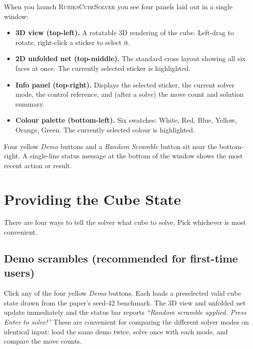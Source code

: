 \documentclass[11pt,a4paper]{article}
\newcommand{\app}{\textsc{RubiksCubeSolver}}
\begin{document}
When you launch \app{} you see four panels laid out in a single window:

\begin{itemize}[leftmargin=2em]
  \item \textbf{3D view (top-left).} A rotatable 3D rendering of the cube.
        Left-drag to rotate, right-click a sticker to select it.
  \item \textbf{2D unfolded net (top-middle).} The standard cross layout
        showing all six faces at once. The currently selected sticker is
        highlighted.
  \item \textbf{Info panel (top-right).} Displays the selected sticker,
        the current solver mode, the control reference, and (after a
        solve) the move count and solution summary.
  \item \textbf{Colour palette (bottom-left).} Six swatches: White, Red,
        Blue, Yellow, Orange, Green. The currently selected colour is
        highlighted.
\end{itemize}

Four yellow \textit{Demo} buttons and a \textit{Random Scramble} button
sit near the bottom-right. A single-line status message at the bottom of
the window shows the most recent action or result.

\section{Providing the Cube State}

There are four ways to tell the solver what cube to solve. Pick whichever
is most convenient.

\subsection{Demo scrambles (recommended for first-time users)}

Click any of the four yellow \textit{Demo} buttons. Each loads a
preselected valid cube state drawn from the paper's seed-42 benchmark.
The 3D view and unfolded net update immediately and the status bar
reports \textit{``Random scramble applied. Press Enter to solve!''}
These are convenient for comparing the different solver modes on
identical input: load the same demo twice, solve once with each mode,
and compare the move counts.
\end{document}
